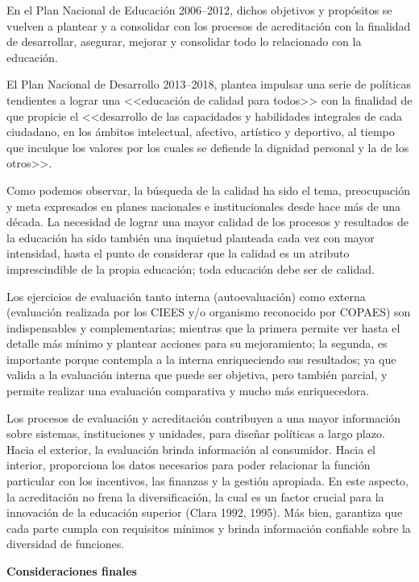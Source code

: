 \enlargethispage{2\baselineskip} 
En el Plan Nacional de Educación 2006--2012, dichos objetivos y propósitos
se vuelven a plantear y a consolidar con los procesos de acreditación con
la finalidad de desarrollar, asegurar, mejorar y consolidar todo lo
relacionado con la educación.

 
El Plan Nacional de Desarrollo 2013--2018, plantea impulsar una serie de
políticas tendientes a lograr una <<educación de calidad para todos>> con la
finalidad de que propicie el <<desarrollo de las capacidades y habilidades
integrales de cada ciudadano, en los ámbitos intelectual, afectivo,
artístico y deportivo, al tiempo que inculque los valores por los cuales se
defiende la dignidad personal y la de los otros>>.

 
 Como podemos observar, la
búsqueda de la calidad ha sido el tema, preocupación y meta expresados en
planes nacionales e institucionales desde hace más de una década. La
necesidad de lograr una mayor calidad de los procesos y resultados de la
educación ha sido también una inquietud planteada cada vez con mayor
intensidad, hasta el punto de considerar que la calidad es un atributo
imprescindible de la propia educación; toda educación debe ser de
calidad.

 
Los ejercicios de evaluación tanto interna (autoevaluación) como externa
(evaluación realizada por los CIEES y\slash{}o organismo reconocido por COPAES)
son indispensables y complementarias; mientras que la primera permite ver
hasta el detalle  más mínimo y plantear acciones  para su mejoramiento; la
segunda, es importante porque contempla a la interna enriqueciendo sus
resultados; ya que valida a la evaluación interna que puede ser objetiva,
pero también parcial, y permite realizar una evaluación comparativa y mucho
más enriquecedora.

 
Los procesos de evaluación y acreditación contribuyen a una mayor
información sobre sistemas, instituciones y unidades, para diseñar
políticas a largo plazo. Hacia el exterior, la evaluación brinda
información al consumidor. Hacia el interior, proporciona los datos
necesarios para poder relacionar la función particular con los incentivos,
las finanzas y la gestión apropiada. En este aspecto, la acreditación no
frena la diversificación, la cual es un factor crucial para la innovación
de la educación superior (Clara 1992, 1995). Más bien, garantiza que cada
parte cumpla con requisitos mínimos y brinda información confiable sobre la
diversidad de funciones.


\medskip
\textbf{Consideraciones finales}

